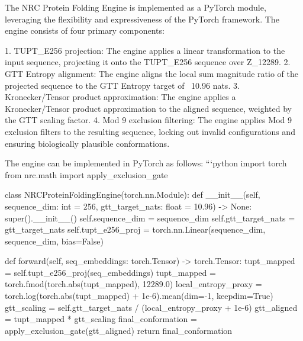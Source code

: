 The NRC Protein Folding Engine is implemented as a PyTorch module, leveraging the flexibility and expressiveness of the PyTorch framework. The engine consists of four primary components:

1. TUPT_E256 projection: The engine applies a linear transformation to the input sequence, projecting it onto the TUPT_E256 sequence over Z_12289.
2. GTT Entropy alignment: The engine aligns the local sum magnitude ratio of the projected sequence to the GTT Entropy target of ~10.96 nats.
3. Kronecker/Tensor product approximation: The engine applies a Kronecker/Tensor product approximation to the aligned sequence, weighted by the GTT scaling factor.
4. Mod 9 exclusion filtering: The engine applies Mod 9 exclusion filters to the resulting sequence, locking out invalid configurations and ensuring biologically plausible conformations.

The engine can be implemented in PyTorch as follows:
```python
import torch
from nrc.math import apply_exclusion_gate

class NRCProteinFoldingEngine(torch.nn.Module):
    def __init__(self, sequence_dim: int = 256, gtt_target_nats: float = 10.96) -> None:
        super().__init__()
        self.sequence_dim = sequence_dim
        self.gtt_target_nats = gtt_target_nats
        self.tupt_e256_proj = torch.nn.Linear(sequence_dim, sequence_dim, bias=False)

    def forward(self, seq_embeddings: torch.Tensor) -> torch.Tensor:
        tupt_mapped = self.tupt_e256_proj(seq_embeddings)
        tupt_mapped = torch.fmod(torch.abs(tupt_mapped), 12289.0)
        local_entropy_proxy = torch.log(torch.abs(tupt_mapped) + 1e-6).mean(dim=-1, keepdim=True)
        gtt_scaling = self.gtt_target_nats / (local_entropy_proxy + 1e-6)
        gtt_aligned = tupt_mapped * gtt_scaling
        final_conformation = apply_exclusion_gate(gtt_aligned)
        return final_conformation